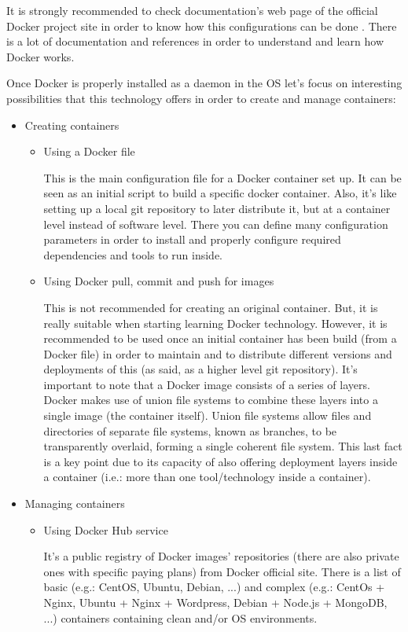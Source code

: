 It is strongly recommended to check documentation's web page of the official Docker project site \cite{docker} in order to know how this configurations can be done . There is a lot of documentation and references in order to understand and learn how Docker works.

Once Docker is properly installed as a daemon in the OS let's focus on interesting possibilities that this technology offers in order to create and manage containers:

\begin{itemize}
\item Creating containers
	\begin{itemize}
	\item Using a Docker file \hfill
	
	This is the main configuration file for a Docker container set up. It can be seen as an initial script to build a specific docker container. Also, it's like setting up a local git repository to later distribute it, but at a container level instead of software level. There you can define many configuration parameters in order to install and properly configure required dependencies and tools to run inside. 	
	
	\item Using Docker pull, commit and push for images

	This is not recommended for creating an original container. But, it is really suitable when starting learning Docker technology. However, it is recommended to be used once an initial container has been build (from a Docker file) in order to maintain and to distribute different versions and deployments of this (as said, as a higher level git repository).	 
It's important to note that a Docker image consists of a series of layers. Docker makes use of union file systems to combine these layers into a single image (the container itself). Union file systems allow files and directories of separate file systems, known as branches, to be transparently overlaid, forming a single coherent file system. This last fact is a key point due to its capacity of also offering deployment layers inside a container (i.e.: more than one tool/technology inside a container).
	
	\end{itemize}
\item Managing containers 
	\begin{itemize}
	\item Using Docker Hub service

	It's a public registry of Docker images' repositories (there are also private ones with specific paying plans) from Docker official site. There is a list of basic (e.g.: CentOS, Ubuntu, Debian, ...) and complex (e.g.: CentOs + Nginx, Ubuntu + Nginx + Wordpress, Debian + Node.js + MongoDB, ...) containers containing clean and/or OS environments. 
	

\end{itemize}
\end{itemize}
